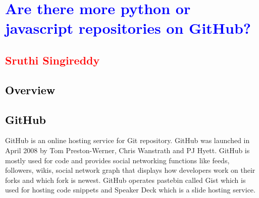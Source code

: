 \documentclass{article}\usepackage[]{graphicx}\usepackage[]{color}
\begin{document}
\lstset{breaklines=true} %



\section*{\LARGE\centering\textcolor{blue}{Are there more python or javascript repositories on GitHub?}}

\subsection*{\Large\centering\textcolor{red}{Sruthi Singireddy }}

\subsection*{\Large\textcolor{black}{Overview}}

\subsection*{\Large\textcolor{black}{GitHub}}
\large{GitHub is an online hosting service for Git repository. GitHub was launched in April 2008 by Tom Preston-Werner, Chris Wanstrath and PJ Hyett. GitHub is mostly used for code and provides social networking functions like feeds, followers, wikis, social network graph that displays how developers work on their forks and which fork is newest. GitHub operates pastebin called Gist which is used for hosting code snippets and Speaker Deck which is a slide hosting service.}
\end{document}
